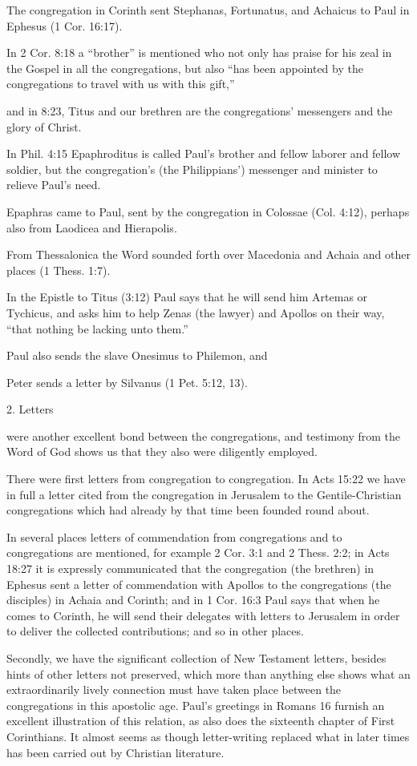 The congregation in Corinth sent Stephanas, Fortunatus, and Achaicus to Paul in Ephesus (1 Cor. 16:17).

In 2 Cor. 8:18 a “brother” is mentioned who not only has praise for his zeal in the Gospel in all the congregations, but also “has been appointed by the congregations to travel with us with this gift,”

and in 8:23, Titus and our brethren are the congregations’ messengers and the glory of Christ.

In Phil. 4:15 Epaphroditus is called Paul’s brother and fellow laborer and fellow soldier, but the congregation’s (the Philippians’) messenger and minister to relieve Paul’s need.

Epaphras came to Paul, sent by the congregation in Colossae (Col. 4:12), perhaps also from Laodicea and Hierapolis.

From Thessalonica the Word sounded forth over Macedonia and Achaia and other places (1 Thess. 1:7).

In the Epistle to Titus (3:12) Paul says that he will send him Artemas or Tychicus, and asks him to help Zenas (the lawyer) and Apollos on their way, “that nothing be lacking unto them.”

Paul also sends the slave Onesimus to Philemon, and

Peter sends a letter by Silvanus (1 Pet. 5:12, 13).

2. Letters

were another excellent bond between the congregations, and testimony from the Word of God shows us that they also were diligently employed.

There were first letters from congregation to congregation. In Acts 15:22 we have in full a letter cited from the congregation in Jerusalem to the Gentile-Christian congregations which had already by that time been founded round about.

In several places letters of commendation from congregations and to congregations are mentioned, for example 2 Cor. 3:1 and 2 Thess. 2:2; in Acts 18:27 it is expressly communicated that the congregation (the brethren) in Ephesus sent a letter of commendation with Apollos to the congregations (the disciples) in Achaia and Corinth; and in 1 Cor. 16:3 Paul says that when he comes to Corinth, he will send their delegates with letters to Jerusalem in order to deliver the collected contributions; and so in other places.

Secondly, we have the significant collection of New Testament letters, besides hints of other letters not preserved, which more than anything else shows what an extraordinarily lively connection must have taken place between the congregations in this apostolic age. Paul’s greetings in Romans 16 furnish an excellent illustration of this relation, as also does the sixteenth chapter of First Corinthians. It almost seems as though letter-writing replaced what in later times has been carried out by Christian literature.

